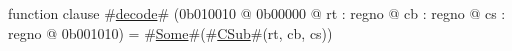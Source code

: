 function clause #\hyperref[zdecode]{decode}# (0b010010 @ 0b00000 @ rt : regno @ cb : regno @ cs : regno @ 0b001010) = #\hyperref[zSome]{Some}#(#\hyperref[zCSub]{CSub}#(rt, cb, cs))
